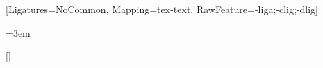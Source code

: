 \usepackage[a4paper,top=0.45in,bottom=0.45in,left=0.65in,right=0.65in]{geometry}
\usepackage{fontspec}
\setmainfont{Latin Modern Roman}[Ligatures=NoCommon, Mapping=tex-text, RawFeature={-liga;-clig;-dlig}]
\usepackage{enumitem}
\usepackage[hidelinks]{hyperref}
\usepackage{titlesec}
\usepackage{xspace}


\pagestyle{empty}
\setlength{\parindent}{0pt}
\setlength{\parskip}{0pt}
\emergencystretch=3em
\titleformat{\section}{\normalsize\bfseries}{}{0pt}{}[\vspace{-3pt}\titlerule]
\titlespacing*{\section}{0pt}{6pt}{3pt}

\newcommand{\resumeheader}[1]{%
  \begin{center}
    {\LARGE\bfseries \FullName}\\[2pt]
    {\large\bfseries #1}\\[2pt]
    \Phone\enspace\textbar\enspace\href{mailto:\Email}{\Email}\enspace\textbar\enspace\Location\\
    \LinkedIn\enspace\textbar\enspace\GitHub\enspace\textbar\enspace\Nationality
  \end{center}\vspace{-8pt}}

\newcommand{\role}[3]{\par\vspace{3pt}\noindent\textbf{#1}, #2\hfill #3\par\nopagebreak}

\newcommand{\project}[2]{\par\noindent\textbf{#1:} #2\par}
